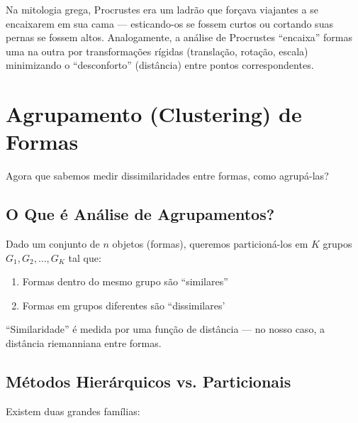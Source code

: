 \documentclass[12pt,a4paper]{article}
\theoremstyle{definition}
\begin{document}
\begin{tcolorbox}[caixaconceito={Mitologia de Procrustes}]
Na mitologia grega, Procrustes era um ladrão que forçava viajantes a se encaixarem em sua cama --- esticando-os se fossem curtos ou cortando suas pernas se fossem altos. Analogamente, a análise de Procrustes ``encaixa'' formas uma na outra por transformações rígidas (translação, rotação, escala) minimizando o ``desconforto'' (distância) entre pontos correspondentes.
\end{tcolorbox}

\section{Agrupamento (Clustering) de Formas}

Agora que sabemos medir dissimilaridades entre formas, como agrupá-las?

\subsection{O Que é Análise de Agrupamentos?}

\begin{tcolorbox}[caixaconceito={Definição Operacional}]
Dado um conjunto de $n$ objetos (formas), queremos particioná-los em $K$ grupos $G_1, G_2, \ldots, G_K$ tal que:
\begin{enumerate}
    \item Formas dentro do mesmo grupo são ``similares''
    \item Formas em grupos diferentes são ``dissimilares'
\end{enumerate}

``Similaridade'' é medida por uma função de distância --- no nosso caso, a distância riemanniana entre formas.
\end{tcolorbox}

\subsection{Métodos Hierárquicos vs.
Particionais}

Existem duas grandes famílias:
\end{document}
